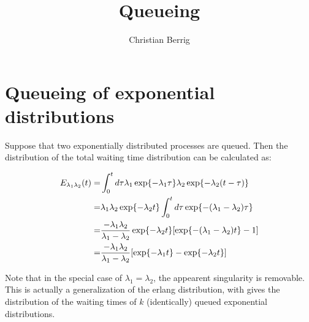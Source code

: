 \documentclass{article}
\author{Christian Berrig}
\title{Queueing}
\begin{document}

\maketitle



\section{Queueing of exponential distributions} 

Suppose that two exponentially distributed processes are queued. 
Then the distribution of the total waiting time distribution can be calculated as:

\begin{align*}
	E_{\lambda_{1} \lambda_{2}}(t) 
	=& \int_{0}^{t} \dd \tau \lambda_{1} \exp{ - \lambda_{1}\tau} \lambda_{2} \exp{- \lambda_{2}(t-\tau)} \\
	=& \lambda_{1} \lambda_{2} \exp{- \lambda_{2} t} \int_{0}^{t} \dd \tau \exp{- (\lambda_{1} - \lambda_{2})\tau} \\
	=& \frac{- \lambda_{1} \lambda_{2}}{\lambda_{1} - \lambda_{2}} \exp{-\lambda_{2} t} \qty[ \exp{-(\lambda_{1} - \lambda_{2}) t } - 1] \\
	=& \frac{- \lambda_{1} \lambda_{2}}{\lambda_{1} - \lambda_{2}} \qty[ \exp{- \lambda_{1} t} - \exp{- \lambda_{2} t}] \\
\end{align*}

Note that in the special case of $\lambda_{1} = \lambda_{2}$, the appearent singularity is removable.
This is actually a generalization of the erlang distribution, with gives the distribution of the waiting times of $k$ (identically) queued exponential distributions.




\appendix

\newpage
% 
% 

% 

% 
\end{document}
